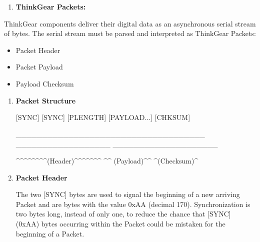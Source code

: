 \documentclass[12pt]{article}
\begin{document}
\begin{enumerate}
\begin{enumerate}
\begin{itemize}
{\small This Data Value consists of two bytes, and represents a single raw wave sample. Its value is a signed 16-bit integer that ranges from 
	-32768 to 32767.}


	\item  Eye-Blink Strength:

{\small This data value is still unavailable.\\}

\end{itemize}

	\item \textbf{ThinkGear Packets:}
\end{enumerate}

ThinkGear components deliver their digital data as an asynchronous serial stream of bytes. The serial stream must be parsed and interpreted as ThinkGear Packets:

\begin{itemize}
	\item Packet Header
	\item Packet Payload
	\item Payload Checksum
\end{itemize}

\begin{enumerate}
	\item \textbf{Packet Structure}


{\raggedright
{\small [SYNC] [SYNC] [PLENGTH]     [PAYLOAD...]     [CHKSUM]}
}

{\raggedright
{\small \_\_\_\_\_\_\_\_\_\_\_\_\_\_\_\_\_\_\_\_\_\_\_\_\_\_\_\_\_\_\_\_\_\_\_\_ \_\_\_\_\_\_\_\_\_\_\_\_\_\_\_\_\_\_ \_\_\_\_\_\_\_\_\_\_\_\_\_\_\_\_\_\_\_\_}
}

{\raggedright
{\small
\textasciicircum{}\textasciicircum{}\textasciicircum{}\textasciicircum{}\textasciicircum{}\textasciicircum{}\textasciicircum{}\textasciicircum{}(Header)\textasciicircum{}\textasciicircum{}\textasciicircum{}\textasciicircum{}\textasciicircum{}\textasciicircum{}\textasciicircum{}
      \textasciicircum{}\textasciicircum{}
(Payload)\textasciicircum{}\textasciicircum{}    
\textasciicircum{}(Checksum)\textasciicircum{}}
}


	\item \textbf{Packet Header}


The two [SYNC] bytes are used to signal the beginning of a new arriving Packet and are bytes with the value 0xAA (decimal 170). Synchronization is two bytes long, instead of only one, to reduce the chance that [SYNC] (0xAA) bytes occurring within the Packet could be mistaken for the beginning of a Packet.


\end{enumerate}
\end{enumerate}
\end{document}
